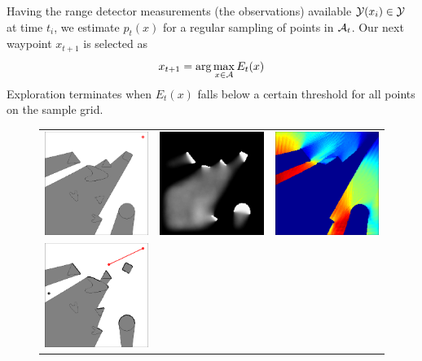 Having the range detector measurements (the observations) available $\mathcal{Y}(x_i) \in \mathcal{Y}$ at time $t_i$, we 
estimate $p_t(x)$ for a regular sampling of points in $\mathcal{A}_t$.  Our next waypoint $x_{t+1}$ is selected as
\begin{equation}
 x_{t+1} = \arg\max_{x\in\mathcal{A}} E_t(x)
\end{equation}
Exploration terminates when $E_t(x)$ falls below a certain threshold for all points on the sample grid.

\begin{figure}
\centering
 \begin{tabular}{ccc}
\includegraphics[width=1.5in]{2D/scene_01}&
\includegraphics[width=1.5in]{2D/marginal_01}&
\includegraphics[width=1.5in]{2D/energy_01}\\
\includegraphics[width=1.5in]{2D/scene_02}&

\end{tabular}
\end{figure}
